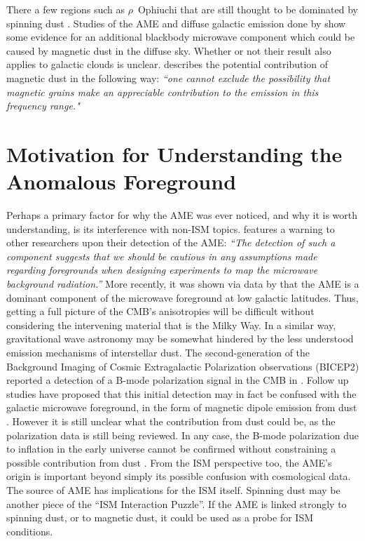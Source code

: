      There a few regions such as $\rho$~Ophiuchi that are still thought to be dominated by spinning dust \cite{casassus08}. Studies of the AME and diffuse galactic emission done by \cite{planckXVii} show some evidence for an additional blackbody microwave component which could be caused by magnetic dust in the diffuse sky.  Whether or not their result also applies to galactic clouds is unclear. \cite{draine99} describes the potential contribution of magnetic dust in the following way: \textit{``one cannot exclude the possibility that magnetic grains make an appreciable contribution to the emission in this frequency range."}

\section{Motivation for Understanding the Anomalous Foreground}
     Perhaps a primary factor for why the AME was ever noticed, and why it is worth understanding, is its interference with non-ISM topics. \cite{leitch97} features a warning to other researchers upon their detection of the AME: \textit{``The detection of such a component suggests that we should be cautious in any assumptions made regarding foregrounds when designing experiments to map the microwave background radiation.”} More recently, it was shown via 
data by \cite{macellari11} that the AME is a dominant component of the microwave foreground at low galactic latitudes. Thus, getting a full picture of the CMB's anisotropies will be difficult without considering the intervening material that is the Milky Way.
     In a similar way, gravitational wave astronomy may be somewhat hindered by the less understood emission mechanisms of interstellar dust. The second-generation of the Background Imaging of Cosmic Extragalactic Polarization observations (BICEP2) reported a detection of a B-mode polarization signal in the CMB in \cite{ade14}.
     Follow up studies have proposed that this initial detection may in fact be confused with the galactic microwave foreground, in the form of magnetic dipole emission from dust \citep{liu14}. However it is still unclear what the contribution from dust could be, as the polarization data is still being reviewed.  In any case, the B-mode polarization due to inflation in the early universe cannot be confirmed without constraining a possible contribution from dust \citep{flauger14,mortonson14}.
     From the ISM perspective too, the AME's origin is important beyond simply its possible confusion with cosmological data. The source of AME has implications for the ISM itself. Spinning dust may be another piece of the ``ISM Interaction Puzzle”. If the AME is linked strongly to spinning dust, or to magnetic dust, it could be used as a probe for ISM conditions.
